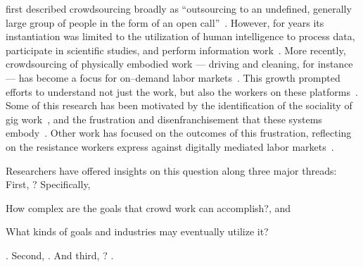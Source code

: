 \documentclass[trackingWork]{subfiles}
\begin{document}
\citeauthor{howe2008crowdsourcing} first described crowdsourcing broadly as
``outsourcing to an undefined, generally large group of people in the form of an open call''~\cite{howe2008crowdsourcing}.
However, for years its instantiation was limited to the utilization of
human intelligence to process data, participate in scientific studies, and perform information work~\cite{CrowdsourcingUserStudies,movieSummarizationWu,yuenSurvey,geiger2011managing,quinnbedersonTaxonomy}.
More recently, crowdsourcing of physically embodied work
--- driving and cleaning, for instance ---
has become a focus for on--demand labor markets~\cite{uberAlgorithm,uberOfficial,zaarlyOfficial,taskrabbitOfficial}.
This growth prompted efforts to understand not just the work, but also the workers on these platforms~\cite{Ross,whoareNOTtheTurkers}.
Some of this research has been motivated by the identification of the sociality of gig work~\cite{crowdcollab},
and the frustration and disenfranchisement that these systems embody~\cite{turkopticon,martin2014being,takingAHITMcInnis}.
Other work has focused on the outcomes of this frustration,
reflecting on the resistance workers express against digitally mediated labor markets~\cite{uberAlgorithm,dynamo}.

Researchers have offered insights on this question along three major threads:
  First, ?
        Specifically,
        \begin{inlinelist}[label=(\alph*)]
          \item How complex are the goals that crowd work can accomplish?, and
          \item What kinds of goals and industries may eventually utilize it?
        \end{inlinelist}
        \cite{foundry,suzukiAtelier,KimStoria,yuanAlmost,YuEncouragingOutside,
              Nebeling:2016:WCW:2858036.2858169,
              Hahn:2016:KAB:2858036.2858364}.
  Second, 
        \cite{embracingErrorKrishna,bernsteinSoylent,sensitiveTasks,
              LykourentzouPersonalityMatters,KucherbaevReLauncher,
              Law:2016:CKC:2858036.2858144,Cai:2016:CRI:2858036.2858237,
              Chang:2016:ACC:2858036.2858411,Newell:2016:OMA:2858036.2858490}.
  And third, ?
        \cite{turkopticon,storiesIraniSilberman,dynamo,crowdcollab,
              whyWouldAnyoneBrewer,takingAHITMcInnis}.
\end{document}
